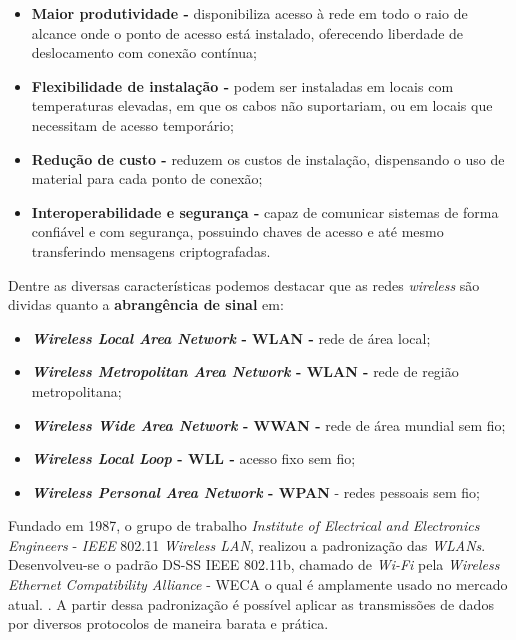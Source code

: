 \begin{itemize}
	\item \textbf{Maior produtividade - } disponibiliza acesso à rede em todo o raio de alcance onde o ponto de acesso está instalado, oferecendo liberdade de deslocamento com conexão contínua;
	
	\item \textbf{Flexibilidade de instalação -} podem ser instaladas em locais com temperaturas elevadas, em que os cabos não suportariam, ou em locais que necessitam de acesso temporário;
	
	\item \textbf{Redução de custo - } reduzem os custos de instalação, dispensando o uso de material para cada ponto de conexão;
	
	\item \textbf{Interoperabilidade e segurança - } capaz de comunicar sistemas de forma confiável e com segurança, possuindo chaves de acesso e até mesmo transferindo mensagens criptografadas.   

\end{itemize}

Dentre as diversas características podemos destacar que as redes \textit{wireless} são dividas quanto a \textbf{abrangência de sinal} em:

\begin{itemize}
	\item \textbf{\textit{Wireless Local Area Network} - WLAN - } rede de área local;
	\item \textbf{\textit{Wireless Metropolitan Area Network} - WLAN - } rede de região metropolitana;
	\item \textbf{\textit{Wireless Wide Area Network} - WWAN - } rede de área mundial sem fio;
	\item \textbf{\textit{Wireless Local Loop} - WLL - } acesso fixo sem fio;
	\item \textbf{\textit{Wireless Personal Area Network} - WPAN} - redes pessoais sem fio;
\end{itemize}

Fundado em 1987, o grupo de trabalho \textit{Institute of Electrical and Electronics Engineers} - \textit{IEEE} 802.11\textit{ Wireless LAN}, realizou a padronização das \textit{WLANs}. Desenvolveu-se o padrão DS-SS IEEE 802.11b, chamado de \textit{Wi-Fi} pela \textit{Wireless Ethernet Compatibility Alliance} - WECA o qual é amplamente usado no mercado atual. \cite{internetdascoisassemmisterios}. A partir dessa padronização é possível aplicar as transmissões de dados por diversos protocolos de maneira barata e prática.


